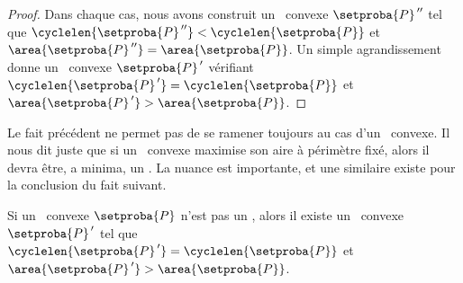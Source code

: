 \begin{proof}
	Dans chaque cas, nous avons construit un \ngone\ convexe $\setproba{P}^{\,\prime\prime}$ tel que
	$\cyclelen{\setproba{P}^{\,\prime\prime}} < \cyclelen{\setproba{P}}$
	et
	$\area{\setproba{P}^{\,\prime\prime}} = \area{\setproba{P}}$.
	Un simple agrandissement donne un \ngone\ convexe $\setproba{P}^{\,\prime}$ vérifiant
	$\cyclelen{\setproba{P}^{\,\prime}} = \cyclelen{\setproba{P}}$
	et
	$\area{\setproba{P}^{\,\prime}} > \area{\setproba{P}}$.
\end{proof}


\begin{remark}
	Le fait précédent ne permet pas de se ramener toujours au cas d'un \nequi\ convexe. Il nous dit juste que si un \ngone\ convexe maximise son aire à périmètre fixé, alors il devra être, a minima, un \nequi. La nuance est importante, et une similaire existe pour la conclusion du fait suivant.
\end{remark}




\begin{fact} \label{almost-reg-poly}
	Si un \nequi\ convexe $\setproba{P}$ n'est pas un \niso,
	alors il existe un \ngone\ convexe $\setproba{P}^{\,\prime}$ tel que
	$\cyclelen{\setproba{P}^{\,\prime}} = \cyclelen{\setproba{P}}$
	et
	$\area{\setproba{P}^{\,\prime}} > \area{\setproba{P}}$.
\end{fact}


